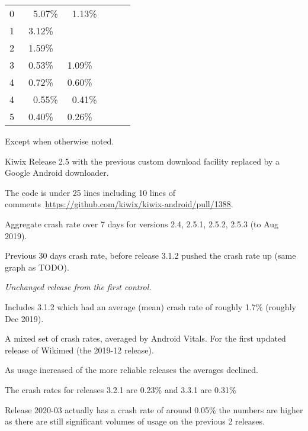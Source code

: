\begin{adjustwidth}{-2.5 cm}{-2.5 cm}
\begin{threeparttable}[!htp]
\begin{tabular}{lrrrrr}
\cellcolor[HTML]{efefef}0 &\cellcolor[HTML]{efefef}5.07\% &1.13\% &\cellcolor[HTML]{efefef} & \\
\cellcolor[HTML]{efefef}1 &\cellcolor[HTML]{efefef}3.12\%~\tnote{1} &\multirow{2}{*}{\cellcolor[HTML]{A8A8A8}}... & \cellcolor[HTML]{efefef} 
& \\
\cellcolor[HTML]{efefef}2~\tnote{2} &\cellcolor[HTML]{efefef}1.59\%~\tnote{3} & \cellcolor[HTML]{A8A8A8}... &\cellcolor[HTML]{efefef} & \\
\cellcolor[HTML]{efefef}3 &\cellcolor[HTML]{efefef}0.53\%~\tnote{4} &1.09\%~\tnote{5} &\cellcolor[HTML]{efefef} & \\
\cellcolor[HTML]{efefef}4 &\cellcolor[HTML]{efefef}0.72\%~\tnote{6} &0.60\%~\tnote{7} &\cellcolor[HTML]{efefef} & \\
\cellcolor[HTML]{efefef}4~\tnote{8} 
&\cellcolor[HTML]{efefef}0.55\% &0.41\% &\cellcolor[HTML]{efefef} & \\
\cellcolor[HTML]{efefef}5 &\cellcolor[HTML]{efefef}0.40\%~\tnote{9} &0.26\%~\tnote{10} &\cellcolor[HTML]{efefef} & \\
\bottomrule
\end{tabular}
\begin{tablenotes}
  \item[0] Except when otherwise noted.
  \item[1] Kiwix Release 2.5 with the previous custom download facility replaced by a Google Android downloader.
  \item[2] The code is under 25 lines including 10 lines of comments~\url{https://github.com/kiwix/kiwix-android/pull/1388}.
  \item[3] Aggregate crash rate over 7 days for versions 2.4, 2.5.1, 2.5.2, 2.5.3 (to Aug  2019).
  \item[4] Previous 30 days crash rate, before release 3.1.2 pushed the crash rate up (same graph as TODO).
  \item[5] \emph{Unchanged release from the first control.}
  \item[6] Includes 3.1.2 which had an average (mean) crash rate of roughly 1.7\% (roughly  Dec 2019).
  \item[7] A mixed set of crash rates, averaged by Android Vitals. For the first updated release of Wikimed (the 2019-12 release).
  \item[8] As usage increased of the more reliable releases the averages declined.
  \item[9] The crash rates for releases 3.2.1 are 0.23\% and 3.3.1 are 0.31\%
  \item[10] Release 2020-03 actually has a crash rate of around 0.05\% the numbers are higher as there are still significant volumes of usage on the previous 2 releases.

\end{tablenotes}
\end{threeparttable}
\end{adjustwidth}
\vspace{10mm}



